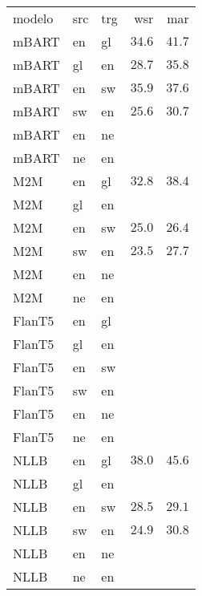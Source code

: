\begin{tabular}{lllrr}
modelo & src & trg & wsr & mar \\
mBART & en & gl & $34.6$ & $41.7$ \\
mBART & gl & en & $28.7$ & $35.8$ \\
mBART & en & sw & $35.9$ & $37.6$ \\
mBART & sw & en & $25.6$ & $30.7$ \\
mBART & en & ne &  &  \\
mBART & ne & en &  &  \\
M2M & en & gl & $32.8$ & $38.4$ \\
M2M & gl & en &  &  \\
M2M & en & sw & $25.0$ & $26.4$ \\
M2M & sw & en & $23.5$ & $27.7$ \\
M2M & en & ne &  &  \\
M2M & ne & en &  &  \\
FlanT5 & en & gl &  &  \\
FlanT5 & gl & en &  &  \\
FlanT5 & en & sw &  &  \\
FlanT5 & sw & en &  &  \\
FlanT5 & en & ne &  &  \\
FlanT5 & ne & en &  &  \\
NLLB & en & gl & $38.0$ & $45.6$ \\
NLLB & gl & en &  &  \\
NLLB & en & sw & $28.5$ & $29.1$ \\
NLLB & sw & en & $24.9$ & $30.8$ \\
NLLB & en & ne &  &  \\
NLLB & ne & en &  &  \\
\end{tabular}
